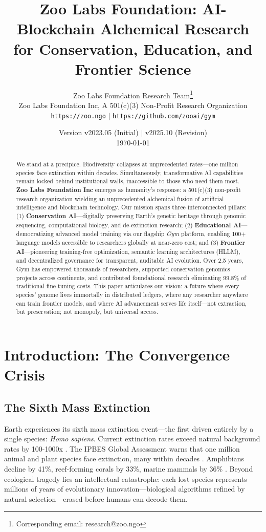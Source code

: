 \documentclass[twocolumn,11pt]{article}
\title{\textbf{Zoo Labs Foundation: AI-Blockchain Alchemical Research for Conservation, Education, and Frontier Science}}
\author{
Zoo Labs Foundation Research Team\thanks{Corresponding email: research@zoo.ngo} \\
\small{Zoo Labs Foundation Inc, A 501(c)(3) Non-Profit Research Organization} \\
\small{\texttt{https://zoo.ngo} $\mid$ \texttt{https://github.com/zooai/gym}}
}
\date{Version v2023.05 (Initial) $\mid$ v2025.10 (Revision) \\
\today}
\begin{document}
\maketitle

\begin{abstract}
\noindent We stand at a precipice. Biodiversity collapses at unprecedented rates—one million species face extinction within decades. Simultaneously, transformative AI capabilities remain locked behind institutional walls, inaccessible to those who need them most. \textbf{Zoo Labs Foundation Inc} emerges as humanity's response: a 501(c)(3) non-profit research organization wielding an unprecedented alchemical fusion of artificial intelligence and blockchain technology. Our mission spans three interconnected pillars: (1) \textbf{Conservation AI}—digitally preserving Earth's genetic heritage through genomic sequencing, computational biology, and de-extinction research; (2) \textbf{Educational AI}—democratizing advanced model training via our flagship \textit{Gym} platform, enabling 100+ language models accessible to researchers globally at near-zero cost; and (3) \textbf{Frontier AI}—pioneering training-free optimization, semantic learning architectures (HLLM), and decentralized governance for transparent, auditable AI evolution. Over 2.5 years, Gym has empowered thousands of researchers, supported conservation genomics projects across continents, and contributed foundational research eliminating 99.8\% of traditional fine-tuning costs. This paper articulates our vision: a future where every species' genome lives immortally in distributed ledgers, where any researcher anywhere can train frontier models, and where AI advancement serves life itself—not extraction, but preservation; not monopoly, but universal access.
\end{abstract}

\section{Introduction: The Convergence Crisis}

\subsection{The Sixth Mass Extinction}

Earth experiences its sixth mass extinction event—the first driven entirely by a single species: \textit{Homo sapiens}. Current extinction rates exceed natural background rates by 100-1000x \citep{ceballos2015accelerated}. The IPBES Global Assessment warns that one million animal and plant species face extinction, many within decades \citep{ipbes2019global}. Amphibians decline by 41\%, reef-forming corals by 33\%, marine mammals by 36\% \citep{wwf2020living}. Beyond ecological tragedy lies an intellectual catastrophe: each lost species represents millions of years of evolutionary innovation—biological algorithms refined by natural selection—erased before humans can decode them.
\end{document}
